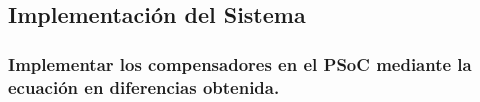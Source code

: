 \subsection{Implementación del Sistema}
\subsubsection{Implementar los compensadores en el PSoC mediante la ecuación en diferencias obtenida.}